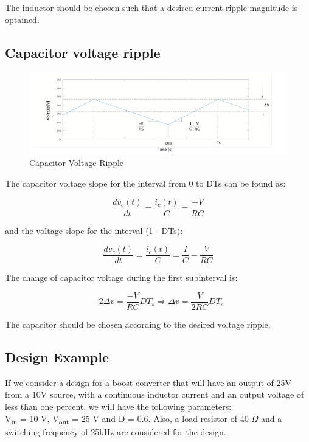 The inductor should be chosen such that a desired current ripple magnitude is optained.

\subsection{Capacitor voltage ripple}\label{sec:CBC_CVR}

\begin{figure}[H]
   \centering
   \includegraphics[width=\textwidth]{figures/aConventionalBoost/CapacitorVoltage.pdf}
    \caption{Capacitor Voltage Ripple}
	\label{fig:CBC_CVR1}
\end{figure}

The capacitor voltage slope for the interval from 0 to DTs can be found as:

\begin{equation}
	\frac{dv_c(t)}{dt} = \frac{i_c(t)}{C} = \frac{-V}{RC}
	\label{eq:CBC_CVR2}
\end{equation}

and the voltage slope for the interval (1 - DTs):

\begin{equation}
	\frac{dv_c(t)}{dt} = \frac{i_c(t)}{C} = \frac{I}{C} - \frac{V}{RC}
	\label{eq:CBC_CVR3}
\end{equation}

The change of capacitor voltage during the first subinterval is:

\begin{equation}
	-2\Delta v = \frac{-V}{RC}DT_s \Rightarrow
  \Delta v = \frac{V}{2RC}DT_s
	\label{eq:CBC_CVR4}
\end{equation}

The capacitor should be chosen according to the desired voltage ripple.

\subsection{Design Example}\label{sec:CBC_DE}

If we consider a design for a boost converter that will have an output of 25V from a 10V source, with a continuous inductor current and an output voltage of less than one percent, we will have the following parameters:\\
V\textsubscript{in} = 10 V, V\textsubscript{out} = 25 V and D = 0.6. Also,
a load resistor of 40 $\Omega$ and a  switching frequency of 25kHz are considered for the design.


